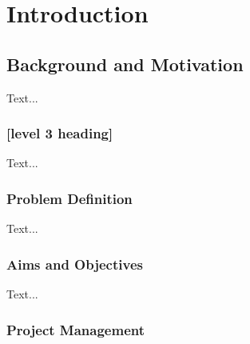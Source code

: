 \documentclass[12pt,a4paper]{report}
\begin{document}


\tableofcontents

\thispagestyle{empty}


\chapter{Introduction}


\setcounter{page}{1}



\section{Background and Motivation}


Text...

\subsection{[level 3 heading]}




Text...

\subsection{Problem Definition}


Text...

\subsection{Aims and Objectives}


Text...


\subsection{Project Management}
\end{document}
